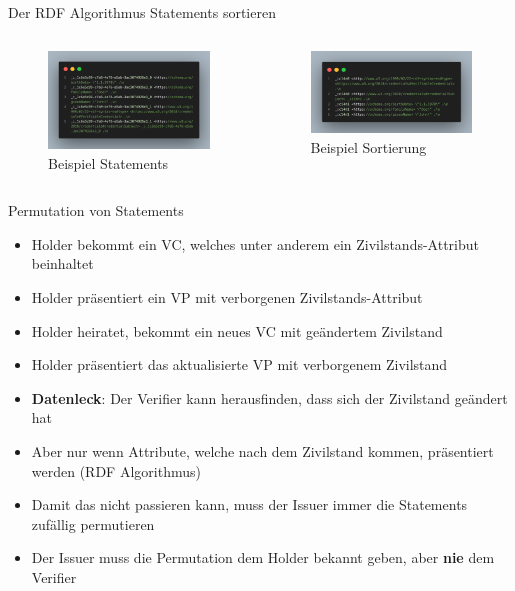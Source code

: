 \documentclass[
	german,%
	authorontitle=true,
	]{bfhbeamer}
\begin{document}
\begin{frame}{Der RDF Algorithmus}
    \centering
    Statements sortieren
    \begin{columns}[onlytextwidth,T]
        \column{70mm}  
        \begin{figure}
            \centering
            \includegraphics[width=70mm]{../img/Statements.png}
            \caption{Beispiel Statements}
        \end{figure}

        \column{70mm}  
        \begin{figure}
            \centering
            \includegraphics[width=70mm]{../img/hashed.png}
            \caption{Beispiel Sortierung}
        \end{figure}
    \end{columns}
\end{frame}

\begin{frame}{Permutation von Statements}
    \begin{itemize}
        \item Holder bekommt ein VC, welches unter anderem ein Zivilstands-Attribut beinhaltet
        \item Holder präsentiert ein VP mit verborgenen Zivilstands-Attribut
        \item Holder heiratet, bekommt ein neues VC mit geändertem Zivilstand
        \item Holder präsentiert das aktualisierte VP mit verborgenem Zivilstand
        \item \textbf{Datenleck}: Der Verifier kann herausfinden, dass sich der Zivilstand geändert hat
        \item Aber nur wenn Attribute, welche nach dem Zivilstand kommen, präsentiert werden (RDF Algorithmus)
        \item Damit das nicht passieren kann, muss der Issuer immer die Statements zufällig permutieren
        \item Der Issuer muss die Permutation dem Holder bekannt geben, aber \textbf{nie} dem Verifier
    \end{itemize}
\end{frame}
\end{document}
